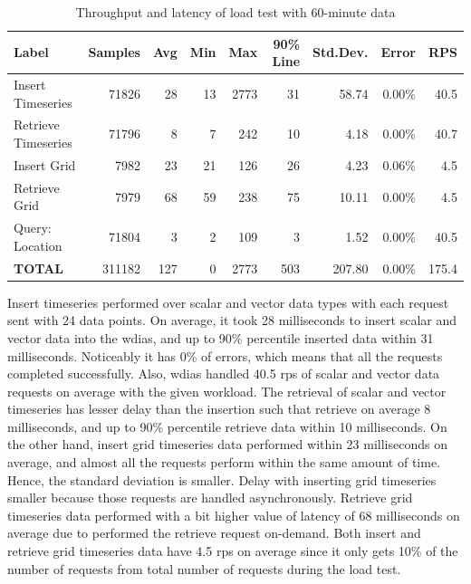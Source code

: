 \begin{table}[ht]
\caption{Throughput and latency of load test with 60-minute data}
\footnotesize
\begin{tabulary}{\linewidth}{|L|R|R|R|R|R|R|R|R|}
\hline
\textbf{Label} & \textbf{Samples} & \textbf{Avg} & \textbf{Min} & \textbf{Max} & \textbf{90\% Line} & \textbf{Std.Dev.} & \textbf{Error} & \textbf{RPS} \\ \hline
Insert Timeseries & 71826 & 28 & 13 & 2773 & 31 & 58.74 & 0.00\% & 40.5 \\ \hline
Retrieve Timeseries & 71796 & 8 & 7 & 242 & 10 & 4.18 & 0.00\% & 40.7 \\ \hline
Insert Grid & 7982 & 23 & 21 & 126 & 26 & 4.23 & 0.06\% & 4.5 \\ \hline
Retrieve Grid & 7979 & 68 & 59 & 238 & 75 & 10.11 & 0.00\% & 4.5 \\ \hline
Query: Location & 71804 & 3 & 2 & 109 & 3 & 1.52 & 0.00\% & 40.5 \\ \hline
\textbf{TOTAL} & 311182 & 127 & 0 & 2773 & 503 & 207.80 & 0.00\% & 175.4 \\ \hline
\end{tabulary}
\label{tab:obs_all_60_min_summary}
\end{table}
Insert timeseries performed over scalar and vector data types with each request sent with 24 data points. On average, it took 28 milliseconds to insert scalar and vector data into the \acrshort{wdias}, and up to 90\% percentile inserted data within 31 milliseconds. Noticeably it has 0\% of errors, which means that all the requests completed successfully. Also, \acrshort{wdias} handled 40.5 \acrshort{rps} of scalar and vector data requests on average with the given workload. The retrieval of scalar and vector timeseries has lesser delay than the insertion such that retrieve on average 8 milliseconds, and up to 90\% percentile retrieve data within 10 milliseconds.
On the other hand, insert grid timeseries data performed within 23 milliseconds on average, and almost all the requests perform within the same amount of time. Hence, the standard deviation is smaller. Delay with inserting grid timeseries smaller because those requests are handled asynchronously. Retrieve grid timeseries data performed with a bit higher value of latency of 68 milliseconds on average due to performed the retrieve request on-demand. Both insert and retrieve grid timeseries data have 4.5 \acrshort{rps} on average since it only gets 10\% of the number of requests from total number of requests during the load test. 

